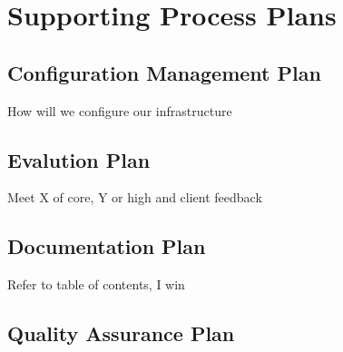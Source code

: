 
\chapter{Supporting Process Plans} %

\label{Part6Chapter6} %



\section{Configuration Management Plan}

How will we configure our infrastructure


\section{Evalution Plan}

Meet X of core, Y or high and client feedback


\section{Documentation Plan}

Refer to table of contents, I win


\section{Quality Assurance Plan}

